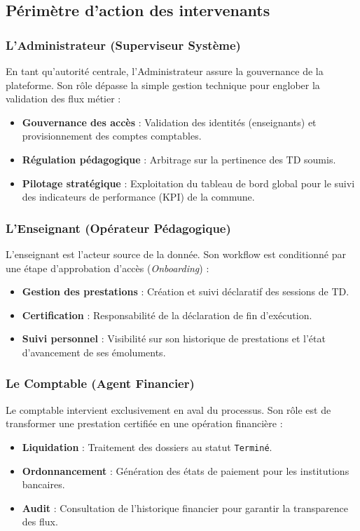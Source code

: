 \subsection{Périmètre d'action des intervenants}

\subsubsection{L'Administrateur (Superviseur Système)}
En tant qu'autorité centrale, l'Administrateur assure la gouvernance de la plateforme. Son rôle dépasse la simple gestion technique pour englober la validation des flux métier :
\begin{itemize}
    \item \textbf{Gouvernance des accès} : Validation des identités (enseignants) et provisionnement des comptes comptables.
    \item \textbf{Régulation pédagogique} : Arbitrage sur la pertinence des TD soumis.
    \item \textbf{Pilotage stratégique} : Exploitation du tableau de bord global pour le suivi des indicateurs de performance (KPI) de la commune.
\end{itemize}

\subsubsection{L'Enseignant (Opérateur Pédagogique)}
L'enseignant est l'acteur source de la donnée. Son workflow est conditionné par une étape d'approbation d'accès (\textit{Onboarding}) :
\begin{itemize}
    \item \textbf{Gestion des prestations} : Création et suivi déclaratif des sessions de TD.
    \item \textbf{Certification} : Responsabilité de la déclaration de fin d'exécution.
    \item \textbf{Suivi personnel} : Visibilité sur son historique de prestations et l'état d'avancement de ses émoluments.
\end{itemize}

\subsubsection{Le Comptable (Agent Financier)}
Le comptable intervient exclusivement en aval du processus. Son rôle est de transformer une prestation certifiée en une opération financière :
\begin{itemize}
    \item \textbf{Liquidation} : Traitement des dossiers au statut \texttt{Terminé}.
    \item \textbf{Ordonnancement} : Génération des états de paiement pour les institutions bancaires.
    \item \textbf{Audit} : Consultation de l'historique financier pour garantir la transparence des flux.
\end{itemize}

